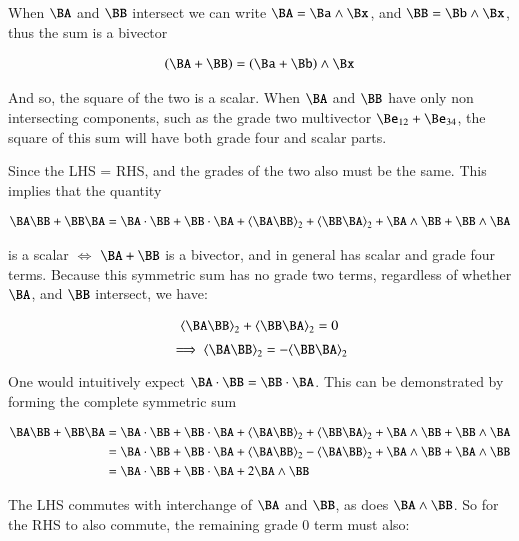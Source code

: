 When $\BA$ and $\BB$ intersect we can write $\BA = \Ba \wedge \Bx$, and $\BB = \Bb \wedge \Bx$, thus the sum is a bivector

\begin{align*}
(\BA + \BB)
= (\Ba + \Bb) \wedge \Bx
\end{align*}

And so, the square of the two is a scalar.  When $\BA$ and $\BB$ have only non intersecting components, such as the grade two  multivector $\Be_{12} + \Be_{34}$, the square of this sum will have both grade four and scalar parts.

Since the LHS = RHS, and the grades of the two also must be the same.  This implies that the quantity

\begin{align*}
\BA \BB + \BB \BA = 
\BA \cdot \BB + \BB \cdot \BA
+\gpgradetwo{\BA \BB} + \gpgradetwo{\BB \BA}
+\BA \wedge \BB + \BB \wedge \BA
\end{align*}

is a scalar $\iff$ $\BA + \BB$ is a bivector, and in general has scalar and grade four terms.  Because this symmetric sum has no grade two terms, regardless of whether $\BA$, and $\BB$ intersect, we have:

\begin{align*}
\gpgradetwo{\BA \BB} + \gpgradetwo{\BB \BA} = 0
\end{align*}
\begin{equation}
\label{eqn:bivector:signgradetwo}
\implies
\gpgradetwo{\BA \BB} = -\gpgradetwo{\BB \BA}
\end{equation}

One would intuitively expect $\BA \cdot \BB = \BB \cdot \BA$.  This can be demonstrated by forming the complete symmetric sum

\begin{align*}
\BA \BB + \BB \BA 
&= 
{\BA \cdot \BB} +{\BB \cdot \BA}
+\gpgrade{\BA \BB}{2} +\gpgrade{\BB \BA}{2}
+{\BA \wedge \BB} + {\BB \wedge \BA} \\
&= 
{\BA \cdot \BB} +{\BB \cdot \BA}
+\gpgrade{\BA \BB}{2} -\gpgrade{\BA \BB}{2}
+{\BA \wedge \BB} + {\BA \wedge \BB} \\
&= 
{\BA \cdot \BB} +{\BB \cdot \BA}
+2{\BA \wedge \BB} \\
\end{align*}

The LHS commutes with interchange of $\BA$ and $\BB$, as does ${\BA \wedge \BB}$.  So for the RHS to also commute, the remaining grade 0 term must also:

